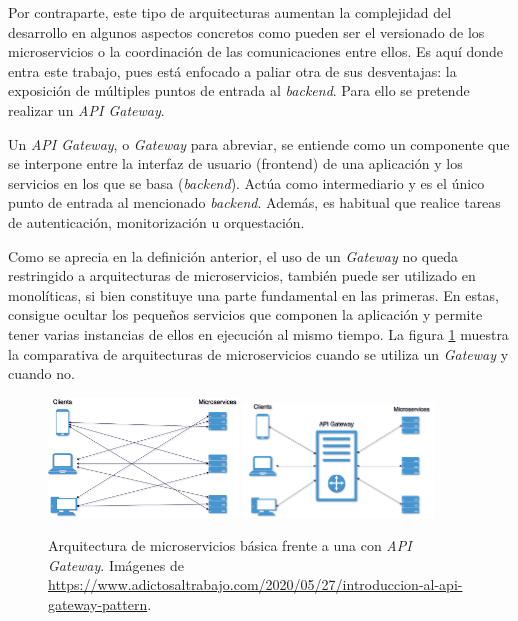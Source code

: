 \documentclass[11pt,spanish,listoffigures]{tfgetsinf}
\begin{document}
Por contraparte, este tipo de arquitecturas aumentan la complejidad del desarrollo en algunos aspectos concretos como pueden ser el versionado de los microservicios o la coordinación de las comunicaciones entre ellos. Es aquí donde entra este trabajo, pues está enfocado a paliar otra de sus desventajas: la exposición de múltiples puntos de entrada al \emph{backend}. Para ello se pretende realizar un \emph{API Gateway}.

Un \emph{API Gateway}, o \emph{Gateway} para abreviar, se entiende como un componente que se interpone entre la interfaz de usuario (frontend) de una aplicación y los servicios en los que se basa (\emph{backend}). Actúa como intermediario y es el único punto de entrada al mencionado \emph{backend}. Además, es habitual que realice tareas de autenticación, monitorización u orquestación.

Como se aprecia en la definición anterior, el uso de un \emph{Gateway} no queda restringido a arquitecturas de microservicios, también puede ser utilizado en monolíticas, si bien constituye una parte fundamental en las primeras. En estas, consigue ocultar los pequeños servicios que componen la aplicación y permite tener varias instancias de ellos en ejecución al mismo tiempo. La figura \ref{figura:gateway_o_no} muestra la comparativa de arquitecturas de microservicios cuando se utiliza un \emph{Gateway} y cuando no.

\begin{figure}[ht]
	\centering
	\label{figura:gateway_o_no}
	\includegraphics[width=0.45\textwidth]{images/arquitecturaMicroserviciosBasica}
	\includegraphics[width=0.45\textwidth]{images/arquitecturaMicroserviciosConGateway}
	\caption{Arquitectura de microservicios básica frente a una con \emph{API Gateway}. Imágenes de \url{https://www.adictosaltrabajo.com/2020/05/27/introduccion-al-api-gateway-pattern}.}
\end{figure}
\end{document}
